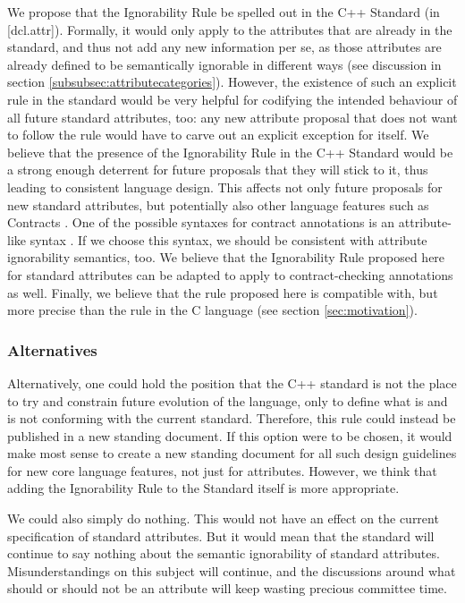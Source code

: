 We propose that the Ignorability Rule be spelled out in the C++ Standard (in [dcl.attr]). Formally, it would only apply to the attributes that are already in the standard, and thus not add any new information per se, as those attributes are already defined to be semantically ignorable in different ways (see discussion in section \ref{subsubsec:attributecategories}). However, the existence of such an explicit rule in the standard would be very helpful for codifying the intended behaviour of all future standard attributes, too: any new attribute proposal that does not want to follow the rule would have to carve out an explicit exception for itself. We believe that the presence of the Ignorability Rule in the C++ Standard would be a strong enough deterrent for future proposals that they will stick to it, thus leading to consistent language design. This affects not only future proposals for new standard attributes, but potentially also other language features such as Contracts \cite{P2521R2}. One of the possible syntaxes for contract annotations is an attribute-like syntax \cite{P2487R0}. If we choose this syntax, we should be consistent with attribute ignorability semantics, too. We believe that the Ignorability Rule proposed here for standard attributes can be adapted to apply to contract-checking annotations as well. Finally, we believe that the rule proposed here is compatible with, but more precise than the rule in the C language (see section \ref{sec:motivation}).

\subsubsection{Alternatives}

Alternatively, one could hold the position that the C++ standard is not the place to try and constrain future evolution of the language, only to define what is and is not conforming with the current standard. Therefore, this rule could instead be published in a new standing document. If this option were to be chosen, it would make most sense to create a new standing document for all such design guidelines for new core language features, not just for attributes. However, we think that adding the Ignorability Rule to the Standard itself is more appropriate.

We could also simply do nothing. This would not have an effect on the current specification of standard attributes. But it would mean that the standard will continue to say nothing about the semantic ignorability of standard attributes. Misunderstandings on this subject will continue, and the discussions around what should or should not be an attribute will keep wasting precious committee time.

